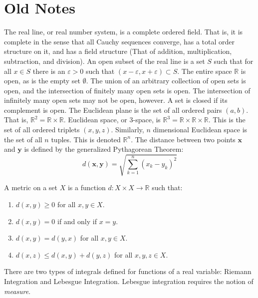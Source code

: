    \section{Old Notes}
        The real line, or real number system, is a complete ordered
        field. That is, it is complete in the sense that all
        Cauchy sequences converge, has a total order structure
        on it, and has a field structure (That of addition,
        multiplication, subtraction, and division).
        An open subset of the real line is a set $S$ such that
        for all $x\in{S}$ there is an $\varepsilon>0$ such that
        $(x-\varepsilon,x+\varepsilon)\subset{S}$. The entire
        space $\mathbb{R}$ is open, as is the empty set
        $\emptyset$. The union of
        an arbitrary collection of open sets is open, and the
        intersection of finitely many open sets is open. The
        intersection of infinitely many open sets may not be
        open, however. A set is closed if its complement is
        open. The Euclidean plane is the set of all ordered
        pairs $(a,b)$. That is,
        $\mathbb{R}^{2}=\mathbb{R}\times\mathbb{R}$. Euclidean
        space, or 3-space, is
        $\mathbb{R}^{3}=\mathbb{R}\times\mathbb{R}\times\mathbb{R}$.
        This is the set of all ordered triplets $(x,y,z)$. Similarly,
        $n$ dimensional Euclidean space is the set of all
        $n$ tuples. This is denoted $\mathbb{R}^{n}$. The distance
        between two points $\mathbf{x}$ and $\mathbf{y}$ is defined
        by the generalized Pythagorean Theorem:
        \begin{equation*}
            d(\mathbf{x},\mathbf{y})=
            \sqrt{\sum_{k=1}^{n}(x_{k}-y_{k})^{2}}
        \end{equation*}
        \begin{definition}
            A metric on a set $X$ is a function
            $d:X\times{X}\rightarrow\mathbb{R}$ such that:
            \begin{enumerate}
                \item $d(x,y)\geq{0}$ for all $x,y\in{X}$.
                \item $d(x,y)=0$ if and only if $x=y$.
                \item $d(x,y)=d(y,x)$ for all $x,y\in{X}$.
                \item $d(x,z)\leq{d(x,y)+d(y,z)}$
                      for all $x,y,z\in{X}$.
            \end{enumerate}
        \end{definition}
        There are two types of integrals defined for functions
        of a real variable: Riemann Integration and Lebesgue Integration.
        Lebesgue integration requires the notion of \textit{measure}.

